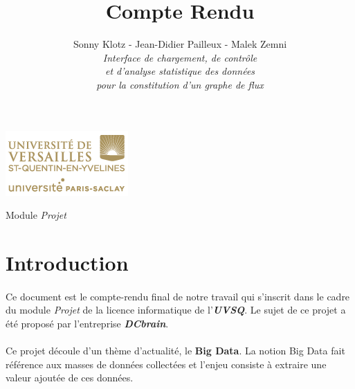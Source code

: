 

\title{\vspace{\fill}\textbf{\Huge Compte Rendu}}
\author{
	Sonny Klotz - Jean-Didier Pailleux - Malek Zemni
	\vspace{2em}\\
	\textit{Interface de chargement, de contrôle}\\\textit{et d’analyse statistique des données}\\\textit{pour la constitution d’un graphe de flux}
	\vspace{2em}
}


\clearpage
\maketitle\vspace{9em}
\begin{center}\includegraphics[scale=0.7]{../Cahier/logo.png}\end{center}
\begin{flushright}Module \textit{Projet}\end{flushright}
\newpage
\tableofcontents
\newpage\clearpage{}

	\section*{Introduction}
	\paragraph{}Ce document est le compte-rendu final de notre travail qui s'inscrit dans le cadre du module \textit{Projet} de la licence informatique de l'\textit{\textbf{UVSQ}}. Le sujet de ce projet a été proposé par l'entreprise \textit{\textbf{DCbrain}}.
	\paragraph{}Ce projet découle d'un thème d’actualité, le \textbf{Big Data}. La notion Big Data fait référence aux masses de données collectées et l'enjeu consiste à extraire une valeur ajoutée de ces données.

